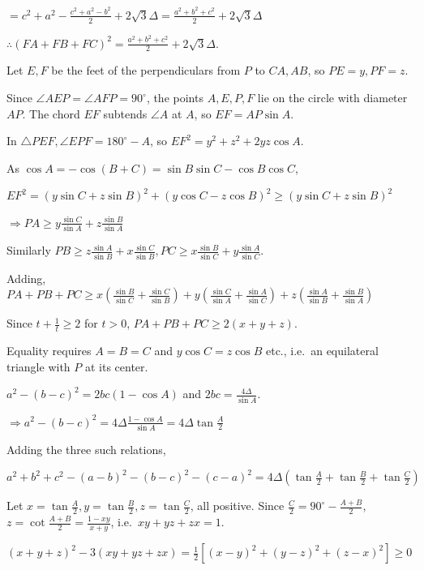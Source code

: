   $= c^2 + a^2 - \frac{c^2 + a^2 - b^2}{2} + 2\sqrt{3}\Delta = \frac{a^2 + b^2 + c^2}{2} + 2\sqrt{3}\Delta$

  $\therefore (FA + FB + FC)^2 = \frac{a^2 + b^2 + c^2}{2} + 2\sqrt{3}\Delta$.
\item Let $E, F$ be the feet of the perpendiculars from $P$ to $CA, AB$, so $PE = y, PF = z$.

  Since $\angle AEP = \angle AFP = 90^\circ$, the points $A, E, P, F$ lie on the circle with diameter $AP$.
  The chord $EF$ subtends $\angle A$ at $A$, so $EF = AP\sin A$.

  In $\triangle PEF, \angle EPF = 180^\circ - A$, so $EF^2 = y^2 + z^2 + 2yz\cos A$.

  As $\cos A = -\cos(B + C) = \sin B\sin C - \cos B\cos C$,

  $EF^2 = (y\sin C + z\sin B)^2 + (y\cos C - z\cos B)^2 \geq (y\sin C + z\sin B)^2$

  $\Rightarrow PA\geq y\frac{\sin C}{\sin A} + z\frac{\sin B}{\sin A}$

  Similarly $PB\geq z\frac{\sin A}{\sin B} + x\frac{\sin C}{\sin B}, PC\geq x\frac{\sin B}{\sin C} +
  y\frac{\sin A}{\sin C}$.

  Adding, $PA + PB + PC\geq x\left(\frac{\sin B}{\sin C} + \frac{\sin C}{\sin B}\right) + y\left(\frac{\sin
  C}{\sin A} + \frac{\sin A}{\sin C}\right) + z\left(\frac{\sin A}{\sin B} + \frac{\sin B}{\sin A}\right)$

  Since $t + \frac{1}{t}\geq 2$ for $t > 0$, $PA + PB + PC\geq 2(x + y + z)$.

  Equality requires $A = B = C$ and $y\cos C = z\cos B$ etc., i.e.\ an equilateral triangle with $P$ at its
  center.
\item $a^2 - (b - c)^2 = 2bc(1 - \cos A)$ and $2bc = \frac{4\Delta}{\sin A}$.

  $\Rightarrow a^2 - (b - c)^2 = 4\Delta\frac{1 - \cos A}{\sin A} = 4\Delta\tan\frac{A}{2}$

  Adding the three such relations,

  $a^2 + b^2 + c^2 - (a - b)^2 - (b - c)^2 - (c - a)^2 = 4\Delta\left(\tan\frac{A}{2} + \tan\frac{B}{2} +
  \tan\frac{C}{2}\right)$

  Let $x = \tan\frac{A}{2}, y = \tan\frac{B}{2}, z = \tan\frac{C}{2}$, all positive. Since $\frac{C}{2} =
  90^\circ - \frac{A + B}{2}$, $z = \cot\frac{A + B}{2} = \frac{1 - xy}{x + y}$, i.e.\ $xy + yz + zx = 1$.

  $(x + y + z)^2 - 3(xy + yz + zx) = \frac{1}{2}\left[(x - y)^2 + (y - z)^2 + (z - x)^2\right]\geq 0$

